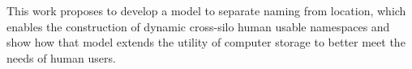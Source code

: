This work proposes to develop a model to separate naming from location, which
enables the construction of dynamic cross-silo human usable name\-spaces and show
how that model extends the utility of computer storage to better meet the needs of
human users.

\vfill
\begin{center}
    \begin{sf}
    \end{sf}
\end{center}
